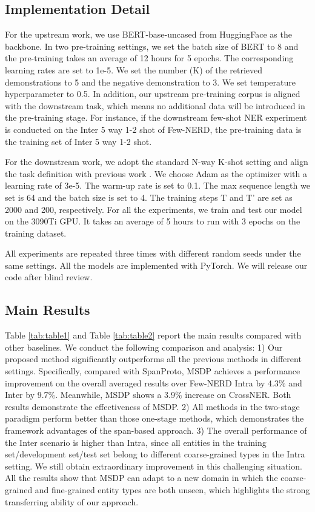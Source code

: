 \documentclass[sigconf,natbib=true,anonymous=False]{acmart}
\begin{document}
\subsection{Implementation Detail}
\label{sec:implement}
For the upstream work, we use BERT-base-uncased \cite{devlin2018bert} from HuggingFace as the backbone. In two pre-training settings, we set the batch size of BERT to 8 and the pre-training takes an average of 12 hours for 5 epochs. The corresponding learning rates are set to 1e-5. We set the number (K) of the retrieved demonstrations to 5 and the negative demonstration to 3. We set temperature hyperparameter to 0.5. In addition, our upstream pre-training corpus is aligned with the downstream task, which means no additional data will be introduced in the pre-training stage. For instance, if the downstream few-shot NER experiment is conducted on the Inter 5 way 1-2 shot of Few-NERD, the pre-training data is the training set of Inter 5 way 1-2 shot.

For the downstream work, we adopt the standard N-way K-shot setting \cite{ding2021few} and align the task definition with previous work \cite{ma2022decomposed}. We choose Adam \cite{kingma2014adam} as the optimizer with a learning rate of 3e-5. The warm-up rate is set to 0.1. The max sequence length we set is 64 and the batch size is set to 4. The training steps T and T' are set as 2000 and 200, respectively. For all the experiments, we train and test our model on the 3090Ti GPU. It takes an average of 5 hours to run with 3 epochs on the training dataset.

All experiments are repeated three times with different random seeds under the same settings. All the models are implemented with PyTorch. We will release our code after blind review. 


\subsection{Main Results}

Table \ref{tab:table1} and Table \ref{tab:table2} report the main results compared with other baselines. We conduct the following comparison and analysis:
1) Our proposed method significantly outperforms all the previous methods in different settings. Specifically, compared with SpanProto, MSDP achieves a performance improvement on the overall averaged results over Few-NERD Intra by 4.3\% and Inter by 9.7\%. Meanwhile, MSDP shows a 3.9\% increase on CrossNER. Both results demonstrate the effectiveness of MSDP.
2) All methods in the two-stage paradigm perform better than those one-stage methods, which demonstrates the framework advantages of the span-based approach.
3) The overall performance of the Inter scenario is higher than Intra, since all entities in the training set/development set/test set belong to different coarse-grained types in the Intra setting. We still obtain extraordinary improvement in this challenging situation. 
All the results show that MSDP can adapt to a new domain in which the coarse-grained and fine-grained entity types are both unseen, which highlights the strong transferring ability of our approach.
\end{document}
